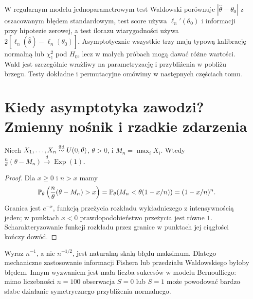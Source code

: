 \begin{przyklad}
W regularnym modelu jednoparametrowym test Waldowski porównuje
$|\widehat\theta-\theta_0|$ z oszacowanym błędem standardowym,
test score używa $\ell_n'(\theta_0)$ i informacji przy hipotezie
zerowej, a test ilorazu wiarygodności używa
$2[\ell_n(\widehat\theta)-\ell_n(\theta_0)]$.
Asymptotycznie wszystkie trzy mają typową kalibrację normalną lub
$\chi^2_1$ pod $H_0$, lecz w małych próbach mogą dawać różne
wartości. Wald jest szczególnie wrażliwy na parametryzację i
przybliżenia w pobliżu brzegu. Testy dokładne i permutacyjne
omówimy w następnych częściach tomu.
\end{przyklad}

\section{Kiedy asymptotyka zawodzi? Zmienny nośnik i rzadkie zdarzenia}
\begin{twierdzenie}
Niech $X_1,\ldots,X_n\mathrel{\overset{\mathrm{iid}}\sim} U(0,\theta)$, $\theta>0$, i
$M_n=\max_iX_i$. Wtedy
$\frac n\theta(\theta-M_n)\xrightarrow{d}\operatorname{Exp}(1)$.
\end{twierdzenie}
\begin{proof}
Dla $x\ge0$ i $n>x$ mamy
\[
\mathbb P_\theta\left(\frac n\theta(\theta-M_n)>x\right)
=\mathbb P_\theta(M_n<\theta(1-x/n))=(1-x/n)^n.
\]
Granica jest $e^{-x}$, funkcją przeżycia rozkładu
wykładniczego z intensywnością jeden; w punktach $x<0$
prawdopodobieństwo przeżycia jest równe $1$.
Scharakteryzowanie funkcji rozkładu przez granice
w punktach jej ciągłości kończy dowód.
\end{proof}

Wyraz $n^{-1}$, a nie $n^{-1/2}$, jest naturalną skalą błędu
maksimum. Dlatego mechaniczne zastosowanie informacji Fishera
lub przedziału Waldowskiego byłoby błędem. Innym wyzwaniem jest
mała liczba sukcesów w modelu Bernoulliego: mimo liczebności
$n=100$ obserwacja $S=0$ lub $S=1$ może powodować bardzo słabe
działanie symetrycznego przybliżenia normalnego.

